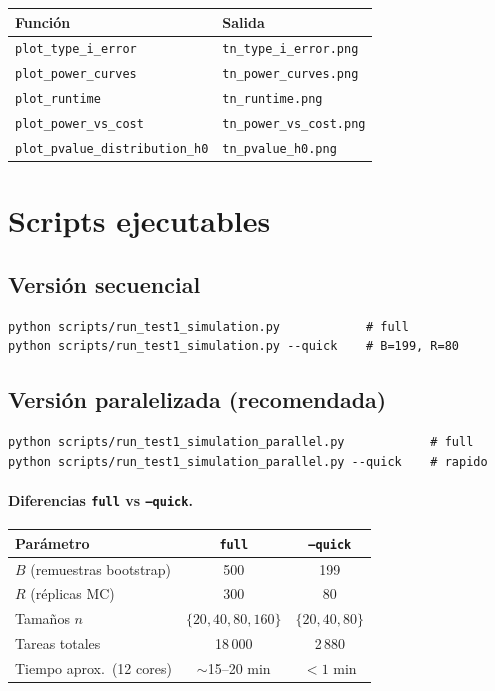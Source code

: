 \documentclass[11pt,a4paper]{article}
\begin{document}
\begin{center}
\small
\begin{tabular}{@{}ll@{}}
\toprule
Función & Salida \\
\midrule
\texttt{plot\_type\_i\_error}     & \texttt{tn\_type\_i\_error.png} \\
\texttt{plot\_power\_curves}      & \texttt{tn\_power\_curves.png} \\
\texttt{plot\_runtime}            & \texttt{tn\_runtime.png} \\
\texttt{plot\_power\_vs\_cost}    & \texttt{tn\_power\_vs\_cost.png} \\
\texttt{plot\_pvalue\_distribution\_h0} & \texttt{tn\_pvalue\_h0.png} \\
\bottomrule
\end{tabular}
\end{center}

\section{Scripts ejecutables}

\subsection{Versión secuencial}
\begin{lstlisting}[style=shellstyle]
python scripts/run_test1_simulation.py            # full
python scripts/run_test1_simulation.py --quick    # B=199, R=80
\end{lstlisting}

\subsection{Versión paralelizada (recomendada)}
\begin{lstlisting}[style=shellstyle]
python scripts/run_test1_simulation_parallel.py            # full
python scripts/run_test1_simulation_parallel.py --quick    # rapido
\end{lstlisting}

\paragraph{Diferencias \texttt{full} vs \texttt{--quick}.}
\begin{center}
\small
\begin{tabular}{@{}lcc@{}}
\toprule
Parámetro & \texttt{full} & \texttt{--quick} \\
\midrule
$B$ (remuestras bootstrap) & 500 & 199 \\
$R$ (réplicas MC) & 300 & 80 \\
Tamaños $n$ & $\{20,40,80,160\}$ & $\{20,40,80\}$ \\
Tareas totales & 18\,000 & 2\,880 \\
Tiempo aprox.\ (12 cores) & $\sim$15--20 min & $<1$ min \\
\bottomrule
\end{tabular}
\end{center}
\end{document}
